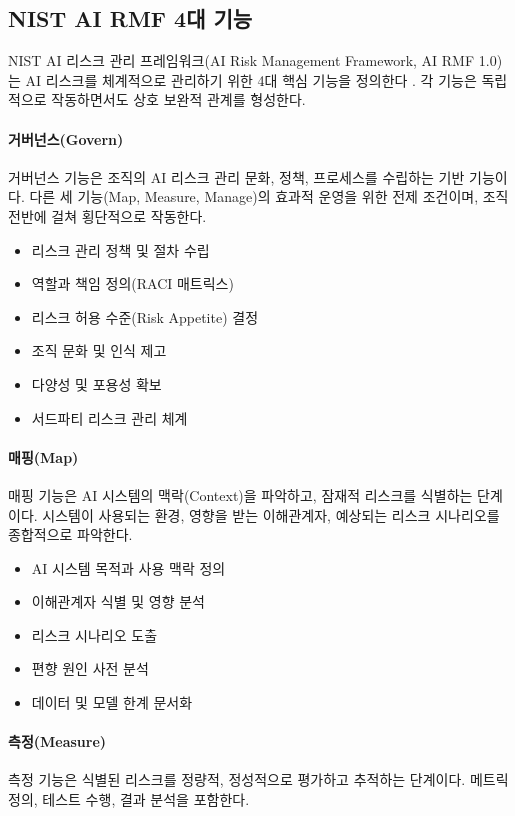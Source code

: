 \subsection{NIST AI RMF 4대 기능}
\label{sec:5.3.2}

NIST AI 리스크 관리 프레임워크(AI Risk Management Framework, AI RMF 1.0)는 AI 리스크를 체계적으로 관리하기 위한 4대 핵심 기능을 정의한다 \cite{nist2023airmf}. 각 기능은 독립적으로 작동하면서도 상호 보완적 관계를 형성한다.

\paragraph{거버넌스(Govern)}
거버넌스 기능은 조직의 AI 리스크 관리 문화, 정책, 프로세스를 수립하는 기반 기능이다. 다른 세 기능(Map, Measure, Manage)의 효과적 운영을 위한 전제 조건이며, 조직 전반에 걸쳐 횡단적으로 작동한다.

\begin{itemize}
 \item 리스크 관리 정책 및 절차 수립
 \item 역할과 책임 정의(RACI 매트릭스)
 \item 리스크 허용 수준(Risk Appetite) 결정
 \item 조직 문화 및 인식 제고
 \item 다양성 및 포용성 확보
 \item 서드파티 리스크 관리 체계
\end{itemize}

\paragraph{매핑(Map)}
매핑 기능은 AI 시스템의 맥락(Context)을 파악하고, 잠재적 리스크를 식별하는 단계이다. 시스템이 사용되는 환경, 영향을 받는 이해관계자, 예상되는 리스크 시나리오를 종합적으로 파악한다.

\begin{itemize}
 \item AI 시스템 목적과 사용 맥락 정의
 \item 이해관계자 식별 및 영향 분석
 \item 리스크 시나리오 도출
 \item 편향 원인 사전 분석
 \item 데이터 및 모델 한계 문서화
\end{itemize}

\paragraph{측정(Measure)}
측정 기능은 식별된 리스크를 정량적, 정성적으로 평가하고 추적하는 단계이다. 메트릭 정의, 테스트 수행, 결과 분석을 포함한다.

